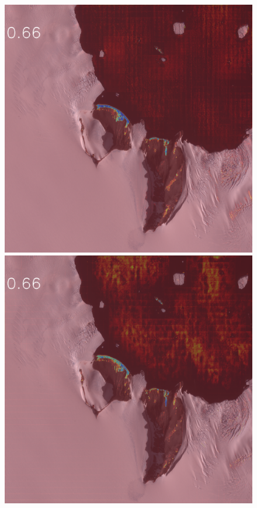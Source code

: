 \begin{figure}[h]
\includegraphics[width=\subFigx]{./fig/datagrow/MSE_single_unet_train_1_3.txt_bias-1_bs128_do0.1e25/1.png}
\includegraphics[width=\subFigx]{./fig/datagrow/MSE_single_unet_train_1_4.txt_bias-1_bs128_do0.1e25/1.png}


\end{figure}
